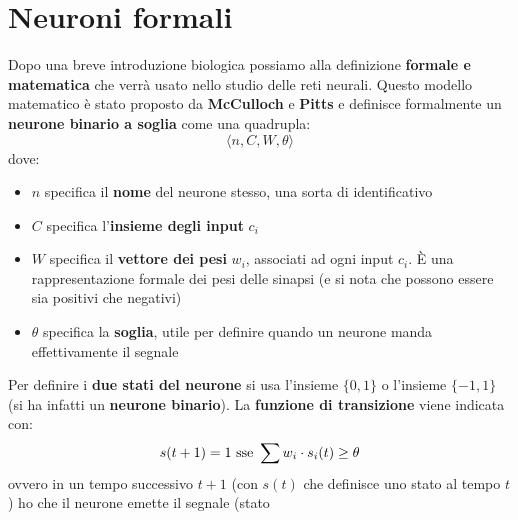 \documentclass[a4paper,12pt, oneside]{book}
\begin{document}
\section{Neuroni formali}
Dopo una breve introduzione biologica possiamo alla definizione \textbf{formale
  e matematica} che verrà usato nello studio delle reti neurali. Questo modello
matematico è stato proposto da \textbf{McCulloch} e \textbf{Pitts} e definisce
formalmente un \textbf{neurone binario a soglia} come una quadrupla:
\[\langle n, C, W, \theta \rangle\]
dove:
\begin{itemize}
  \item $n$ specifica il \textbf{nome} del neurone stesso, una sorta di
  identificativo
  \item $C$ specifica l'\textbf{insieme degli input} $c_i$
  \item $W$ specifica il \textbf{vettore dei pesi} $w_i$, associati ad ogni
  input $c_i$. È una rappresentazione formale dei pesi delle sinapsi (e si nota
  che possono essere sia positivi che negativi)
  \item $\theta$ specifica la \textbf{soglia}, utile per definire quando un
  neurone manda effettivamente il segnale
\end{itemize}
Per definire i \textbf{due stati del neurone} si usa l'insieme $\{0,1\}$ o
l'insieme $\{-1,1\}$ (si ha infatti un \textbf{neurone binario}). La
\textbf{funzione di transizione} viene indicata con:
\[s(t+1)=1 \mbox{ \textnormal{sse} }\sum w_i\cdot s_i(t)\geq \theta\]
ovvero in un tempo successivo $t+1$ (con $s(t)$ che definisce uno stato al tempo
$t$) ho che il neurone emette il segnale (stato
\end{document}
